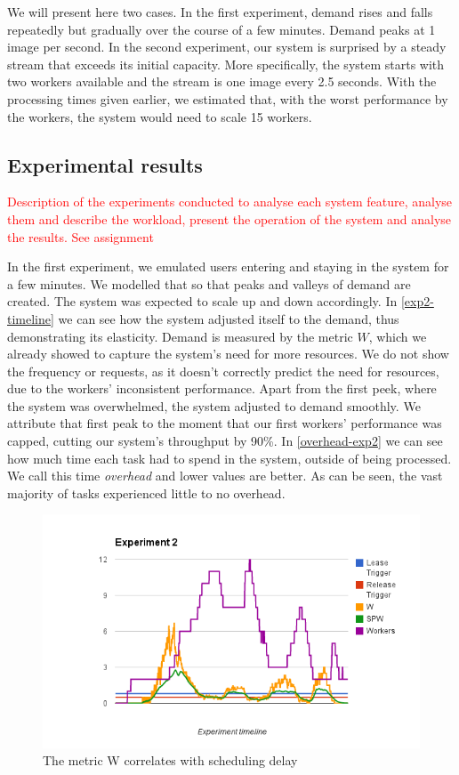 \documentclass{stylesheet}
\begin{document}
We will present here two cases. In the first experiment, demand rises and falls repeatedly but gradually over the course of a few minutes. Demand peaks at 1 image per second. In the second experiment, our system is surprised by a steady stream that exceeds its initial capacity. More specifically, the system starts with two workers available and the stream is one image every 2.5 seconds. With the processing times given earlier, we estimated that, with the worst performance by the workers, the system would need to scale 15 workers. 

\subsection{Experimental results}
\label{subsec:results}
\textcolor{red}{Description of the experiments conducted to analyse each system feature, analyse them and describe the workload, present the operation of the system and analyse the results. See assignment}

In the first experiment, we emulated users entering and staying in the system for a few minutes. We modelled that so that peaks and valleys of demand are created. The system was expected to scale up and down accordingly. In \cref{exp2-timeline} we can see how the system adjusted itself to the demand, thus demonstrating its elasticity. Demand is measured by the metric $W$, which we already showed to capture the system's need for more resources. We do not show the frequency or requests, as it doesn't correctly predict the need for resources, due to the workers' inconsistent performance. Apart from the first peek, where the system was overwhelmed, the system adjusted to demand smoothly. We attribute that first peak to the moment that our first workers' performance was capped, cutting our system's throughput by 90\%. In \cref{overhead-exp2} we can see how much time each task had to spend in the system, outside of being processed. We call this time \textit{overhead} and lower values are better. As can be seen, the vast majority of tasks experienced little to no overhead.

\begin{figure}[b!]
	\centering
	\includegraphics[width=\linewidth]{exp2-timeline.png}
	\caption{The metric W correlates with scheduling delay}
	\label{fig:exp2-timeline}
\end{figure}
\end{document}
